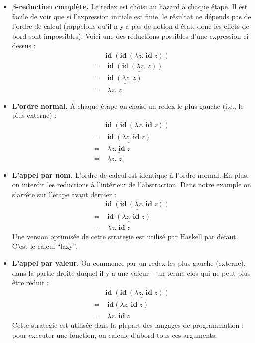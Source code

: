 \documentclass[12pt, a4paper]{article}
\newcommand{\id}{\mathbf{id}}
\begin{document}
\begin{itemize}
	\item \textbf{$\beta$-reduction complète.}
		Le redex est choisi au hazard à chaque étape. Il est facile de voir que si l'expression initiale est finie, le résultat ne dépends pas de l'ordre de calcul (rappelons qu'il n y a pas de notion d'état, donc les effets de bord sont impossibles).
		Voici une des réductions possibles d'une expression ci-dessus :
		\begin{align*}
			& \id \; (\id \; (\lambda z. \; \underline{\id \; z})) \\
			= & \; \id \; \underline{(\id \; (\lambda z. \; z))} \\
			= & \; \underline{\id \; (\lambda z. \; z)} \\
			= & \; \lambda z. \; z
		\end{align*}
	\item \textbf{L'ordre normal.}
		À chaque étape on choisi un redex le plus gauche (i.e., le plus externe) :
		\begin{align*}
			& \underline{\id \; (\id \; (\lambda z. \; \id \; z))} \\
			= & \; \underline{\id \; (\lambda z. \; \id \; z)} \\
			= & \; \underline{\lambda z. \; \id \; z} \\
			= & \; \lambda z. \; z
		\end{align*}		
	\item \textbf{L'appel par nom.}
		L'ordre de calcul est identique à l'ordre normal. En plus, on interdit les reductions à l'intérieur de l'abstraction. Dans notre example on s'arrête sur l'étape avant dernier :
		\begin{align*}
			& \underline{\id \; (\id \; (\lambda z. \; \id \; z))} \\
			= & \; \underline{\id \; (\lambda z. \; \id \; z)} \\
			= & \; \lambda z. \; \id \; z
		\end{align*}
		Une version optimisée de cette strategie est utilisé par Haskell par défaut.
		C'est le calcul ``lazy''.
	\item \textbf{L'appel par valeur.}
		On commence par un redex les plus gauche (externe), dans la partie droite duquel il y a une valeur -- un terme clos qui ne peut plus être réduit :
		\begin{align*}
			& \id \; \underline{(\id \; (\lambda z. \; \id \; z))} \\
			= & \; \underline{\id (\lambda z. \; \id \; z)} \\
			= & \; \lambda z. \; \id \; z
		\end{align*}
		Cette strategie est utilisée dans la plupart des langages de programmation : pour executer une fonction, on calcule d'abord tous ces arguments.
\end{itemize}
\end{document}
